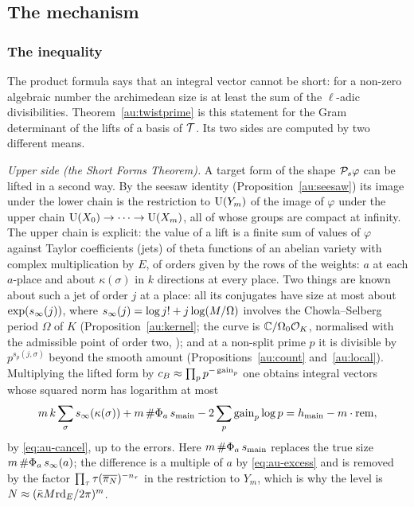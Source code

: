 \documentclass[10pt]{amsart}
\theoremstyle{definition}
\theoremstyle{remark}
\newcommand{\C}{\mathbb C}
\begin{document}
\subsection{The mechanism}\label{ss:au-mechanism}

\subsubsection*{The inequality}
The product formula says that an integral vector cannot be short: for a non-zero algebraic number
the archimedean size is at least the sum of the $\ell$-adic divisibilities.
Theorem~\ref{au:twistprime} is this statement for the Gram determinant of the lifts of a basis of
$\mathcal T$. Its two sides are computed by two different means.

\emph{Upper side (the Short Forms Theorem).} A target form of the shape $\mathcal P_s\varphi$ can be lifted in a second
way. By the seesaw identity (Proposition~\ref{au:seesaw}) its image under the lower chain is the
restriction to $\mathrm U(Y_m)$ of the image of $\varphi$ under the upper chain
$\mathrm U(X_0)\to\dots\to\mathrm U(X_m)$, all of whose groups are compact at infinity. The upper chain is
explicit: the value of a lift is a finite sum of values of $\varphi$ against Taylor coefficients
(jets) of theta functions of an abelian variety with complex multiplication by $E$, of orders
given by the rows of the weights: $a$ at each $a$-place and about $\kappa(\sigma)$ in $k$
directions at every place. Two things are known about such a jet of order $j$ at a place: all
its conjugates have size at most about $\exp(s_\infty(j))$, where $s_\infty(j)=\log j!+j\log(M/
\Omega)$ involves the Chowla--Selberg period $\Omega$ of $K$ (Proposition~\ref{au:kernel}; the curve
is $\C/\Omega_0\auO_K$, normalised with the admissible point of order two, {\cite[\S7.1]{P49}}); and at
a non-split prime $p$ it is divisible by $p^{s_p(j,\sigma)}$ beyond the smooth amount
(Propositions~\ref{au:count} and~\ref{au:local}). Multiplying the lifted form by
$c_B\approx\prod_pp^{-\operatorname{gain}_p}$ one obtains integral vectors whose squared norm has
logarithm at most
\[
m\,k\sum_\sigma s_\infty(\kappa(\sigma))+m\,\#\Phi_a\,s_{\mathrm{main}}-2\sum_p\operatorname{gain}_p\log p=
h_{\mathrm{main}}-m\cdot\operatorname{rem} ,
\]
by \eqref{eq:au-cancel}, up to the errors. Here $m\,\#\Phi_a\,s_{\mathrm{main}}$ replaces the true size
$m\,\#\Phi_a\,s_\infty(a)$; the difference is a multiple of $a$ by \eqref{eq:au-excess} and is
removed by the factor $\prod_\tau\tau(\overline{\pi_N})^{-n_\tau}$ in the restriction to $Y_m$, which
is why the level is $N\approx(\bar\kappa M\mathrm{rd}_E/2\pi)^m$.
\end{document}
